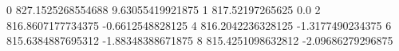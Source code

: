 0 827.1525268554688 9.63055419921875
1 817.52197265625 0.0
2 816.8607177734375 -0.6612548828125
4 816.2042236328125 -1.3177490234375
6 815.6384887695312 -1.88348388671875
8 815.4251098632812 -2.09686279296875
